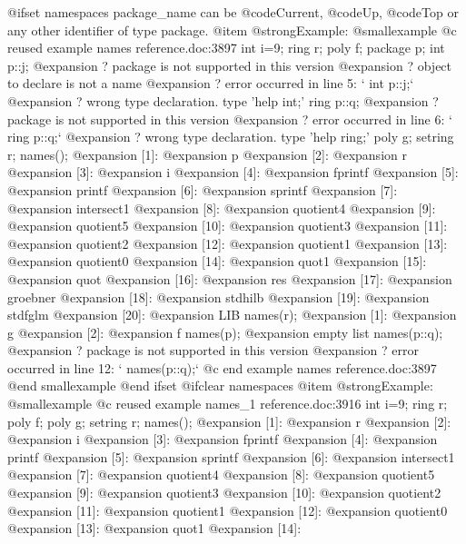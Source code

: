 {@ifset namespaces
package_name can be @code{Current}, @code{Up}, @code{Top} or any other
identifier of type package.
@item @strong{Example:}
@smallexample
@c reused example names reference.doc:3897 
  int i=9;
  ring r;
  poly f;
  package p;
  int p::j;
@expansion{}    ? package is not supported in this version
@expansion{}    ? object to declare is not a name
@expansion{}    ? error occurred in line 5: `  int p::j;`
@expansion{}    ? wrong type declaration. type 'help int;'
  ring p::q;
@expansion{}    ? package is not supported in this version
@expansion{}    ? error occurred in line 6: `  ring p::q;`
@expansion{}    ? wrong type declaration. type 'help ring;'
  poly g;
  setring r;
  names();
@expansion{} [1]:
@expansion{}    p
@expansion{} [2]:
@expansion{}    r
@expansion{} [3]:
@expansion{}    i
@expansion{} [4]:
@expansion{}    fprintf
@expansion{} [5]:
@expansion{}    printf
@expansion{} [6]:
@expansion{}    sprintf
@expansion{} [7]:
@expansion{}    intersect1
@expansion{} [8]:
@expansion{}    quotient4
@expansion{} [9]:
@expansion{}    quotient5
@expansion{} [10]:
@expansion{}    quotient3
@expansion{} [11]:
@expansion{}    quotient2
@expansion{} [12]:
@expansion{}    quotient1
@expansion{} [13]:
@expansion{}    quotient0
@expansion{} [14]:
@expansion{}    quot1
@expansion{} [15]:
@expansion{}    quot
@expansion{} [16]:
@expansion{}    res
@expansion{} [17]:
@expansion{}    groebner
@expansion{} [18]:
@expansion{}    stdhilb
@expansion{} [19]:
@expansion{}    stdfglm
@expansion{} [20]:
@expansion{}    LIB
  names(r);
@expansion{} [1]:
@expansion{}    g
@expansion{} [2]:
@expansion{}    f
  names(p);
@expansion{} empty list
  names(p::q);
@expansion{}    ? package is not supported in this version
@expansion{}    ? error occurred in line 12: `  names(p::q);`
@c end example names reference.doc:3897
@end smallexample
@end ifset
@ifclear namespaces
@item @strong{Example:}
@smallexample
@c reused example names_1 reference.doc:3916 
  int i=9;
  ring r;
  poly f;
  poly g;
  setring r;
  names();
@expansion{} [1]:
@expansion{}    r
@expansion{} [2]:
@expansion{}    i
@expansion{} [3]:
@expansion{}    fprintf
@expansion{} [4]:
@expansion{}    printf
@expansion{} [5]:
@expansion{}    sprintf
@expansion{} [6]:
@expansion{}    intersect1
@expansion{} [7]:
@expansion{}    quotient4
@expansion{} [8]:
@expansion{}    quotient5
@expansion{} [9]:
@expansion{}    quotient3
@expansion{} [10]:
@expansion{}    quotient2
@expansion{} [11]:
@expansion{}    quotient1
@expansion{} [12]:
@expansion{}    quotient0
@expansion{} [13]:
@expansion{}    quot1
@expansion{} [14]:
}

